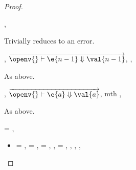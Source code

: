 \begin{lemma}
\begin{proof}
\begin{case}[B-Method]
\end{case}

\begin{case}[BE-Method1]
  \opsem {\openv{}}
         {}
         {\errorval{\val{}}},
  \opsem {\openv{}}
         {\e{}}
         {\errorval{\val{}}}

         Trivially reduces to an error.
\end{case}
\begin{case}[BE-Method2]
  \opsem {\openv{}}
         {}
         {},
 $\overrightarrow{
  \opsem {\openv{}}
         {\e{n-1}}
         {\val{n-1}}
       }$,
  \opsem {\openv{}}
         {}
         {\errorval{\val{}}},
  \opsem {\openv{}}
         {\e{}}
         {\errorval{\val{}}}

  As above.
\end{case}
\begin{case}[BE-Method3]
  \opsem {\openv{}}
         {}
         {},
  $\overrightarrow{
  \opsem {\openv{}}
         {\e{a}}
         {\val{a}}
       }$,
   {} {mth}
                    {} {}
                    {}
                    {\errorvalv{}},
  \opsem {\openv{}} {\e{}} {\errorvalv{}}

  As above.

\end{case}

\begin{case}[B-DefMulti]
  \val{} = { {\emptydisptable}},
  \opsem {\openv{}} {} {}



\begin{itemize}
  \item[]
\begin{subcase}[T-DefMulti]
  \ep{} = {\createmultiexp {\s{}} {}},
  \s{} = {\ArrowOne {\x{}} {} {}
                          {
                                      {}}
                          {}},
   = {\ArrowOne {\x{}} {} {}
                          {
                                      {}}
                          {}},
\judgementtworewrite {\propenv{}} {\ep{}} {\sp{}} {\e{}},
  \e{} = {\createmultiexp {\s{}} {}},
  ,
  \inpropenv{\topprop{}}{\thenprop{\prop{}}},
  \inpropenv{\botprop{}}{\elseprop{\prop{}}},
  \issubobjin{}{\emptyobject{}}{\object{}}



\end{subcase}
\end{itemize}
\end{case}
\end{proof}
\end{lemma}

